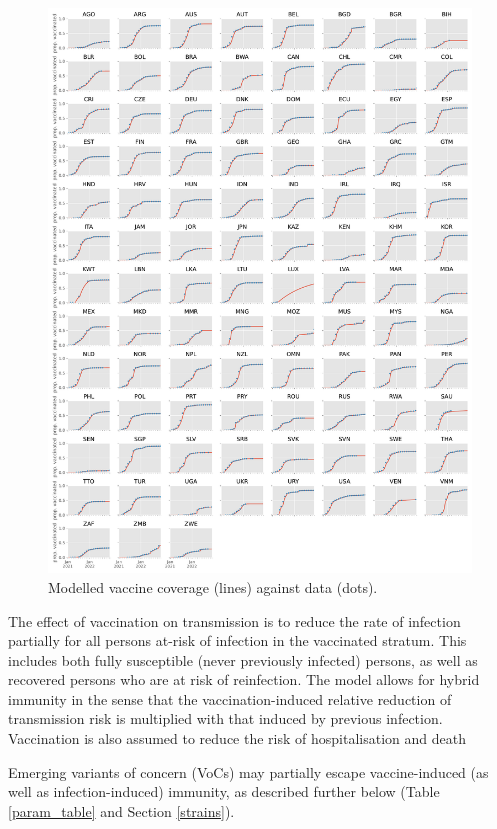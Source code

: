 \begin{figure}[h]
    \begin{center}
    \includegraphics[width=1.0\textwidth]{../../tex_descriptions/projects/sm_covid/vacc_coverage.pdf}
    \end{center}
    \caption{Modelled vaccine coverage (lines) against data (dots).
    } 
    \label{fig:vaccination}
\end{figure}

The effect of vaccination on transmission is to reduce the rate of infection partially for all persons at-risk of infection in the vaccinated stratum.
This includes both fully susceptible (never previously infected) persons,
as well as recovered persons who are at risk of reinfection. The model allows for hybrid immunity
in the sense that the vaccination-induced relative reduction of transmission risk is multiplied with that induced by previous infection. Vaccination is also assumed to reduce the risk of hospitalisation and death 

Emerging variants of concern (VoCs) may partially escape vaccine-induced (as well as infection-induced) immunity, as described further below (Table \ref{param_table} and Section \ref{strains}).